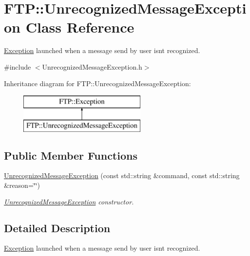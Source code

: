 \hypertarget{classFTP_1_1UnrecognizedMessageException}{}\section{F\+T\+P\+:\+:Unrecognized\+Message\+Exception Class Reference}
\label{classFTP_1_1UnrecognizedMessageException}


\hyperlink{classFTP_1_1Exception}{Exception} launched when a message send by user isn\textquotesingle{}t recognized.  




{\ttfamily \#include $<$Unrecognized\+Message\+Exception.\+h$>$}

Inheritance diagram for F\+T\+P\+:\+:Unrecognized\+Message\+Exception\+:\begin{figure}[H]
\begin{center}
\leavevmode
\includegraphics[height=2.000000cm]{classFTP_1_1UnrecognizedMessageException}
\end{center}
\end{figure}
\subsection*{Public Member Functions}
\begin{DoxyCompactItemize}
\item 
\hyperlink{classFTP_1_1UnrecognizedMessageException_ab4fc5bbfce2fd43536fd17ea6fc3aa4a}{Unrecognized\+Message\+Exception} (const std\+::string \&command, const std\+::string \&reason=\char`\"{}\char`\"{})
\begin{DoxyCompactList}\small\item\em \hyperlink{classFTP_1_1UnrecognizedMessageException}{Unrecognized\+Message\+Exception} constructor. \end{DoxyCompactList}\end{DoxyCompactItemize}


\subsection{Detailed Description}
\hyperlink{classFTP_1_1Exception}{Exception} launched when a message send by user isn\textquotesingle{}t recognized. 

